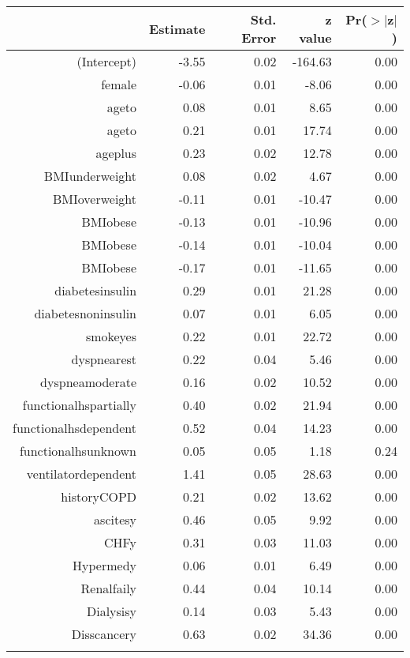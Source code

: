 \bigskip\bigskip
\centering
\begin{tabular}{rrrrr}
  \hline
 & Estimate & Std. Error & z value & Pr($>$$|$z$|$) \\ 
  \hline
(Intercept) & -3.55 & 0.02 & -164.63 & 0.00 \\ 
  female & -0.06 & 0.01 & -8.06 & 0.00 \\ 
  age\-65\-to\-74 & 0.08 & 0.01 & 8.65 & 0.00 \\ 
  age\-75\-to\-84 & 0.21 & 0.01 & 17.74 & 0.00 \\ 
  age\-85\-plus & 0.23 & 0.02 & 12.78 & 0.00 \\ 
  BMI\-underweight & 0.08 & 0.02 & 4.67 & 0.00 \\ 
  BMI\-overweight & -0.11 & 0.01 & -10.47 & 0.00 \\ 
  BMI\-obese\-1 & -0.13 & 0.01 & -10.96 & 0.00 \\ 
  BMI\-obese\-2 & -0.14 & 0.01 & -10.04 & 0.00 \\ 
  BMI\-obese\-3 & -0.17 & 0.01 & -11.65 & 0.00 \\ 
  diabetes\-insulin & 0.29 & 0.01 & 21.28 & 0.00 \\ 
  diabetes\-noninsulin & 0.07 & 0.01 & 6.05 & 0.00 \\ 
  smoke\-yes & 0.22 & 0.01 & 22.72 & 0.00 \\ 
  dyspnea\-rest & 0.22 & 0.04 & 5.46 & 0.00 \\ 
  dyspnea\-moderate & 0.16 & 0.02 & 10.52 & 0.00 \\ 
  functional\-hs\-partially & 0.40 & 0.02 & 21.94 & 0.00 \\ 
  functional\-hs\-dependent & 0.52 & 0.04 & 14.23 & 0.00 \\ 
  functional\-hs\-unknown & 0.05 & 0.05 & 1.18 & 0.24 \\ 
  ventilator\-dependent & 1.41 & 0.05 & 28.63 & 0.00 \\ 
  history\-COPD & 0.21 & 0.02 & 13.62 & 0.00 \\ 
  ascites\-y & 0.46 & 0.05 & 9.92 & 0.00 \\ 
  CHF\-y & 0.31 & 0.03 & 11.03 & 0.00 \\ 
  Hyper\-med\-y & 0.06 & 0.01 & 6.49 & 0.00 \\ 
  Renal\-fail\-y & 0.44 & 0.04 & 10.14 & 0.00 \\ 
  Dialysis\-y & 0.14 & 0.03 & 5.43 & 0.00 \\ 
  Diss\-cancer\-y & 0.63 & 0.02 & 34.36 & 0.00 \\ 
$$
\end{tabular}
